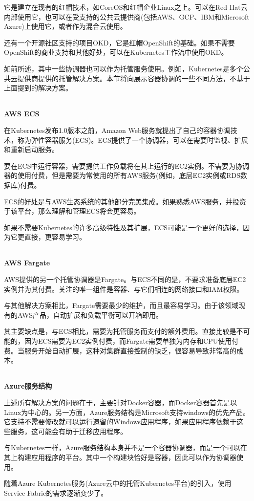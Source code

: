 它是建立在现有的红帽技术，如CoreOS和红帽企业Linux之上。可以在Red Hat云内部使用它，也可以在受支持的公共云提供商(包括AWS、GCP、IBM和Microsoft Azure)上使用它，或者作为混合云使用。

还有一个开源社区支持的项目OKD，它是红帽OpenShift的基础。如果不需要OpenShift的商业支持和其他好处，可以在Kubernetes工作流中使用OKD。


如前所述，其中一些协调器也可以作为托管服务使用。例如，Kubernetes是多个公共云提供商提供的托管解决方案。本节将向展示容器协调的一些不同方法，不基于上面提到的解决方案。

\hspace*{\fill} \\ %
\noindent
\textbf{AWS ECS}

在Kubernetes发布1.0版本之前，Amazon Web服务就提出了自己的容器协调技术，称为弹性容器服务(ECS)。ECS提供了一个协调器，可以在需要时监视、扩展和重新启动服务。

要在ECS中运行容器，需要提供工作负载将在其上运行的EC2实例。不需要为协调器的使用付费，但是需要为常使用的所有AWS服务(例如，底层EC2实例或RDS数据库)付费。

ECS的好处是与AWS生态系统的其他部分完美集成。如果熟悉AWS服务，并投资于该平台，那么理解和管理ECS将会更容易。

如果不需要Kubernetes的许多高级特性及其扩展，ECS可能是一个更好的选择，因为它更直接，更容易学习。

\hspace*{\fill} \\ %
\noindent
\textbf{AWS Fargate}

AWS提供的另一个托管协调器是Fargate。与ECS不同的是，不要求准备底层EC2实例并为其付费。关注的唯一组件是容器、与它们相连的网络接口和IAM权限。

与其他解决方案相比，Fargate需要最少的维护，而且最容易学习。由于该领域现有的AWS产品，自动扩展和负载平衡可以开箱即用。

其主要缺点是，与ECS相比，需要为托管服务而支付的额外费用。直接比较是不可能的，因为ECS需要为EC2实例付费，而Fargate需要单独为内存和CPU使用付费。当服务开始自动扩展，这种对集群直接控制的缺乏，很容易导致非常高的成本。

\hspace*{\fill} \\ %
\noindent
\textbf{Azure服务结构}

上述所有解决方案的问题在于，主要针对Docker容器，而Docker容器首先是以Linux为中心的。另一方面，Azure服务结构是Microsoft支持windows的优先产品。它支持不需要修改就可以运行遗留的Windows应用程序，如果应用程序依赖于这些服务，这可能会有助于迁移应用程序。

与Kubernetes一样，Azure服务结构本身并不是一个容器协调器，而是一个可以在其上构建应用程序的平台。其中一个构建块恰好是容器，因此可以作为协调器使用。

随着Azure Kubernetes服务(Azure云中的托管Kubernetes平台)的引入，使用Service Fabric的需求逐渐变少了。








